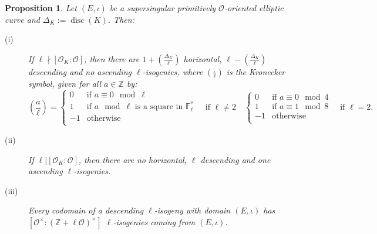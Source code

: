 \documentclass[a4paper,10pt]{report}
\theoremstyle{definition}
\theoremstyle{plain}
\newtheorem{Proposition}[Definition]{Proposition}
\theoremstyle{definition}
\newcommand{\Z}{\mathbb{Z}}
\newcommand{\F}{\mathbb{F}}
\newcommand{\mO}{\mathcal{O}}
\renewcommand{\(}{\left(}
\renewcommand{\)}{\right)}
\DeclareMathOperator{\disc}{disc}
\begin{document}
\begin{Proposition}\label{Proposition 5}
Let $(E,\iota)$ be a supersingular primitively $\mO$-oriented elliptic curve and $\Delta_K:=\disc(K)$. Then:
\begin{description}
\item[(i)] If $\ell\nmid [\mO_K:\mO]$, then there are $1+\(\frac{\Delta_K}{\ell}\)$ horizontal, $\ell-\(\frac{\Delta_K}{\ell}\)$ descending and no ascending $\ell$-isogenies, where $\(\frac{.}{\ell}\)$ is the Kronecker symbol, given for all $a\in\Z$ by:
\[\(\frac{a}{\ell}\)=\left\{\begin{array}{cl}
0 & \mbox{if } a\equiv 0 \mod\ell \\
1 & \mbox{if } a \mod \ell \mbox{ is a square in } \F_\ell^*\\
-1 & \mbox{otherwise}\\
\end{array}\right. \quad \mbox{if } \ell\neq 2 \quad \left\{\begin{array}{cl}
0 & \mbox{if } a\equiv 0 \mod 4 \\
1 & \mbox{if } a\equiv 1 \mod 8\\
-1 & \mbox{otherwise}\\
\end{array}\right.\quad \mbox{if } \ell=2.\]
\item[(ii)] If $\ell|[\mO_K:\mO]$, then there are no horizontal, $\ell$ descending and one ascending $\ell$-isogenies.
\item[(iii)] Every codomain of a descending $\ell$-isogeny with domain $(E,\iota)$ has $[\mO^\times:(\Z+\ell\mO)^\times]$ $\ell$-isogenies coming from $(E,\iota)$. 
\end{description}
\end{Proposition}
\end{document}
